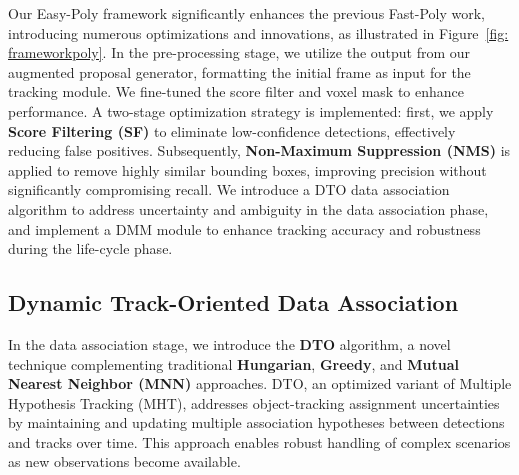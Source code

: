 




Our Easy-Poly framework significantly enhances the previous Fast-Poly work, introducing numerous optimizations and innovations, as illustrated in Figure~\ref{fig: frameworkpoly}.
In the pre-processing stage, we utilize the output from our augmented proposal generator, formatting the initial frame as input for the tracking module. We fine-tuned the score filter and voxel mask to enhance performance. A two-stage optimization strategy is implemented: first, we apply \textbf{Score Filtering (SF)} to eliminate low-confidence detections, effectively reducing false positives. Subsequently, \textbf{Non-Maximum Suppression (NMS)} is applied to remove highly similar bounding boxes, improving precision without significantly compromising recall. We introduce a DTO data association algorithm to address uncertainty and ambiguity in the data association phase, and implement a DMM module to enhance tracking accuracy and robustness during the life-cycle phase.

\subsection{Dynamic Track-Oriented Data Association}

In the data association stage, we introduce the \textbf{DTO} algorithm, a novel technique complementing traditional \textbf{Hungarian}, \textbf{Greedy}, and \textbf{Mutual Nearest Neighbor (MNN)} approaches. DTO, an optimized variant of Multiple Hypothesis Tracking (MHT), addresses object-tracking assignment uncertainties by maintaining and updating multiple association hypotheses between detections and tracks over time. This approach enables robust handling of complex scenarios as new observations become available.

